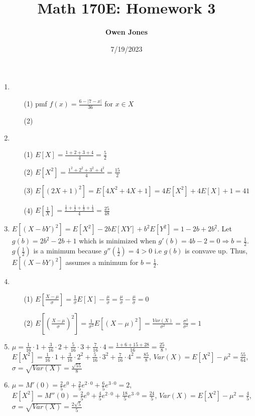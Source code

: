\documentclass{article}
\title{\bf Math 170E: Homework 3}
\date{7/19/2023}
\author{\bf Owen Jones}
\begin{document}
\maketitle

\begin{enumerate}[label=\textbf{Problem \arabic*.}]
\item \begin{itemize}
    \item [(1)] pmf $f(x)=\frac{6-|7-x|}{36}$ for $x\in X$
    \item [(2)]
    \end{itemize}
\item \begin{itemize}
    \item [(1)] $E[X]=\frac{1+2+3+4}{4}=\frac{5}{2}$
    \item [(2)] $E[X^2]=\frac{1^2+2^2+3^2+4^2}{4}=\frac{15}{2}$
    \item [(3)] $E[(2X+1)^2]=E[4X^2+4X+1]=4E[X^2]+4E[X]+1=41$
    \item [(4)] $E[\frac{1}{X}]=\frac{\frac{1}{1}+\frac{1}{2}+\frac{1}{3}+\frac{1}{4}}{4}=\frac{25}{48}$
\end{itemize}
\item $E[(X-bY)^2]=E[X^2]-2bE[XY]+b^2E[Y^2]=1-2b+2b^2$. Let $g(b)=2b^2-2b+1$ which is minimized when $g'(b)=4b-2=0\Rightarrow b=\frac{1}{2}$. $g(\frac{1}{2})$ is a minimum because $g''(\frac{1}{2})=4>0$ i.e $g(b)$ is convave up. Thus, $E[(X-bY)^2]$ assumes a minimum for $b=\frac{1}{2}$.
\item \begin{itemize}
    \item [(1)] $E[\frac{X-\mu}{\sigma}]=\frac{1}{\sigma}E[X]-\frac{\mu}{\sigma}=\frac{\mu}{\sigma}-\frac{\mu}{\sigma}=0$
    \item [(2)] $E[(\frac{X-\mu}{\sigma})^2]=\frac{1}{\sigma^2}E[(X-\mu)^2]=\frac{Var(X)}{\sigma^2}=\frac{\sigma^2}{\sigma^2}=1$
\end{itemize}
\item $\mu=\frac{1}{16}\cdot1+\frac{3}{16}\cdot2+\frac{5}{16}\cdot3+\frac{7}{16}\cdot4=\frac{1+6+15+28}{16}=\frac{25}{8}$, $E[X^2]=\frac{1}{16}\cdot1+\frac{3}{16}\cdot2^2+\frac{5}{16}\cdot3^2+\frac{7}{16}\cdot4^2=\frac{85}{8}$, $Var(X)=E[X^2]-\mu^2=\frac{55}{64}$, $\sigma=\sqrt{Var(X)}=\frac{\sqrt{55}}{8}$
\item $\mu=M'(0)=\frac{2}{5}e^0+\frac{2}{5}e^{2\cdot0}+\frac{6}{5}e^{3\cdot0}=2$, $E[X^2]=M''(0)=\frac{2}{5}e^0+\frac{4}{5}e^{2\cdot0}+\frac{18}{5}e^{3\cdot0}=\frac{24}{5}$, $Var(X)=E[X^2]-\mu^2=\frac{4}{5}$, $\sigma=\sqrt{Var(X)}=\frac{2\sqrt{5}}{5}$
\end{enumerate}
\end{document}
